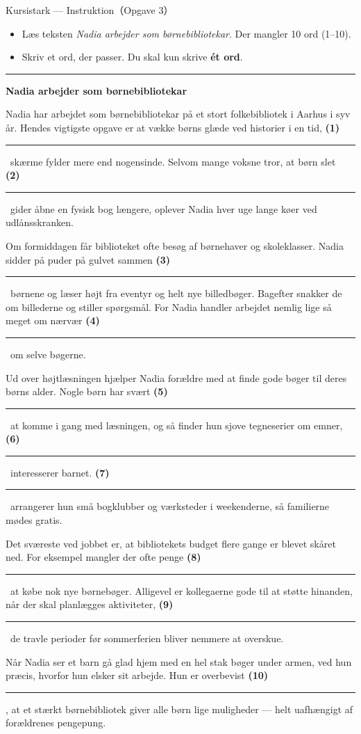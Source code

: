 \begin{emailbox}{Kursistark --- Instruktion（Opgave 3）}
\begin{itemize}
  \item Læs teksten \textit{Nadia arbejder som børnebibliotekar}. Der mangler 10 ord (1--10).
  \item Skriv et ord, der passer. Du skal kun skrive \textbf{ét ord}.
\end{itemize}

\vspace{0.35em}
\hrule
\vspace{0.45em}

\textbf{\color{NCDNavy}Nadia arbejder som børnebibliotekar}

\vspace{0.3em}
Nadia har arbejdet som børnebibliotekar på et stort folkebibliotek i Aarhus i syv år. Hendes vigtigste opgave er at vække børns glæde ved historier i en tid, \textbf{(1)}\ \rule{1.8cm}{0.4pt}\ skærme fylder mere end nogensinde. Selvom mange voksne tror, at børn slet \textbf{(2)}\ \rule{1.8cm}{0.4pt}\ gider åbne en fysisk bog længere, oplever Nadia hver uge lange køer ved udlånsskranken.

\vspace{0.25em}
Om formiddagen får biblioteket ofte besøg af børnehaver og skoleklasser. Nadia sidder på puder på gulvet sammen \textbf{(3)}\ \rule{1.8cm}{0.4pt}\ børnene og læser højt fra eventyr og helt nye billedbøger. Bagefter snakker de om billederne og stiller spørgsmål. For Nadia handler arbejdet nemlig lige så meget om nærvær \textbf{(4)}\ \rule{1.8cm}{0.4pt}\ om selve bøgerne.

\vspace{0.25em}
Ud over højtlæsningen hjælper Nadia forældre med at finde gode bøger til deres børns alder. Nogle børn har svært \textbf{(5)}\ \rule{1.8cm}{0.4pt}\ at komme i gang med læsningen, og så finder hun sjove tegneserier om emner, \textbf{(6)}\ \rule{1.8cm}{0.4pt}\ interesserer barnet. \textbf{(7)}\ \rule{1.8cm}{0.4pt}\ arrangerer hun små bogklubber og værksteder i weekenderne, så familierne mødes gratis.

\vspace{0.25em}
Det sværeste ved jobbet er, at bibliotekets budget flere gange er blevet skåret ned. For eksempel mangler der ofte penge \textbf{(8)}\ \rule{1.8cm}{0.4pt}\ at købe nok nye børnebøger. Alligevel er kollegaerne gode til at støtte hinanden, når der skal planlægges aktiviteter, \textbf{(9)}\ \rule{1.8cm}{0.4pt}\ de travle perioder før sommerferien bliver nemmere at overskue.

\vspace{0.25em}
Når Nadia ser et barn gå glad hjem med en hel stak bøger under armen, ved hun præcis, hvorfor hun elsker sit arbejde. Hun er overbevist \textbf{(10)}\ \rule{1.8cm}{0.4pt}, at et stærkt børnebibliotek giver alle børn lige muligheder --- helt uafhængigt af forældrenes pengepung.
\end{emailbox}

